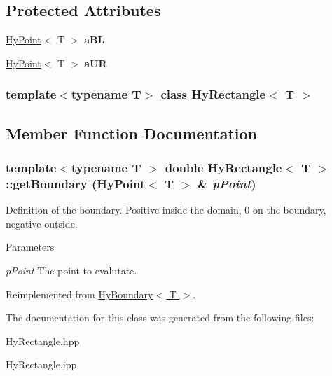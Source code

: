 \subsection*{Protected Attributes}
\begin{DoxyCompactItemize}
\item 
\hypertarget{classHyRectangle_a6558ec991eedf516873b99aecc128b9f}{
\hyperlink{classHyPoint}{HyPoint}$<$ T $>$ {\bfseries aBL}}
\label{classHyRectangle_a6558ec991eedf516873b99aecc128b9f}

\item 
\hypertarget{classHyRectangle_a2442aa3cd909f02ca86b4b3cf4c78e6b}{
\hyperlink{classHyPoint}{HyPoint}$<$ T $>$ {\bfseries aUR}}
\label{classHyRectangle_a2442aa3cd909f02ca86b4b3cf4c78e6b}

\end{DoxyCompactItemize}
\subsubsection*{template$<$typename T$>$ class HyRectangle$<$ T $>$}



\subsection{Member Function Documentation}
\hypertarget{classHyRectangle_a881f7ed847a94d1af3ff4ff0d60ee516}{
\subsubsection[{getBoundary}]{\setlength{\rightskip}{0pt plus 5cm}template$<$typename T $>$ double {\bf HyRectangle}$<$ T $>$::getBoundary ({\bf HyPoint}$<$ T $>$ \& {\em pPoint})}}
\label{classHyRectangle_a881f7ed847a94d1af3ff4ff0d60ee516}


Definition of the boundary. Positive inside the domain, 0 on the boundary, negative outside. 


\begin{DoxyParams}{Parameters}
\item[{\em pPoint}]The point to evalutate. \end{DoxyParams}


Reimplemented from \hyperlink{classHyBoundary_a138c96a97075dc41eead25963c1bf785}{HyBoundary$<$ T $>$}.



The documentation for this class was generated from the following files:\begin{DoxyCompactItemize}
\item 
HyRectangle.hpp\item 
HyRectangle.ipp\end{DoxyCompactItemize}
